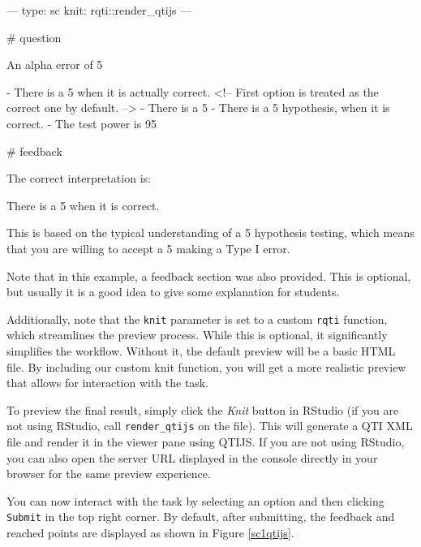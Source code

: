 \documentclass[twoside]{tufte-book}
\newenvironment{Shaded}{}{}
\begin{document}
\begin{Shaded}
\begin{Highlighting}
---
type: sc
knit: rqti::render_qtijs
---

# question

An alpha error of 5% means that:

- There is a 5% probability that you will mistakenly reject the null hypothesis, 
when it is actually correct. <!-- First option is treated as the correct one by 
default. -->
- There is a 5% probability that the null hypothesis is correct.
- There is a 5% probability that you will mistakenly reject the alternative 
hypothesis, when it is correct.
- The test power is 95%.

# feedback

The correct interpretation is:

There is a 5% probability that you will mistakenly reject the null hypothesis, 
when it is correct.

This is based on the typical understanding of a 5% significance level in
hypothesis testing, which means that you are willing to accept a 5% chance of
making a Type I error.
\end{Highlighting}
\end{Shaded}

Note that in this example, a feedback section was also provided. This is optional, but usually it is a good idea to give some explanation for students.

Additionally, note that the \texttt{knit} parameter is set to a custom \texttt{rqti} function, which streamlines the preview process. While this is optional, it significantly simplifies the workflow. Without it, the default preview will be a basic HTML file. By including our custom knit function, you will get a more realistic preview that allows for interaction with the task.

To preview the final result, simply click the \emph{Knit} button in RStudio (if you are not using RStudio, call \texttt{render\_qtijs} on the file). This will generate a QTI XML file and render it in the viewer pane using QTIJS. If you are not using RStudio, you can also open the server URL displayed in the console directly in your browser for the same preview experience.

You can now interact with the task by selecting an option and then clicking \texttt{Submit} in the top right corner. By default, after submitting, the feedback and reached points are displayed as shown in Figure \ref{sc1qtijs}.
\end{document}
